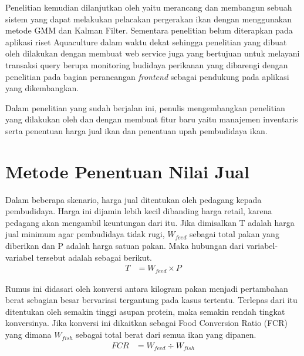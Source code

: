 Penelitian \citep{bagus2022} kemudian dilanjutkan oleh \citep{hafiz2021} yaitu merancang dan membangun sebuah sistem yang dapat melakukan pelacakan pergerakan ikan dengan menggunakan metode GMM dan Kalman Filter. Sementara penelitian \citep{fadhil2021} belum diterapkan pada aplikasi riset Aquaculture dalam waktu dekat sehingga penelitian yang dibuat oleh \citep{andri2022} dilakukan dengan membuat web service juga yang bertujuan untuk melayani transaksi query berupa monitoring budidaya perikanan yang dibarengi dengan penelitian \citep{gian2022} pada bagian perancangan \textit{frontend} sebagai pendukung pada aplikasi yang dikembangkan.

Dalam penelitian yang sudah berjalan ini, penulis mengembangkan penelitian yang dilakukan oleh \citep{andri2022} dan \citep{gian2022} dengan membuat fitur baru yaitu manajemen inventaris serta penentuan harga jual ikan dan penentuan upah pembudidaya ikan.

\section{Metode Penentuan Nilai Jual}

Dalam beberapa skenario, harga jual ditentukan oleh pedagang kepada pembudidaya. Harga ini dijamin lebih kecil dibanding harga retail, karena pedagang akan mengambil keuntungan dari itu. Jika dimisalkan T adalah harga jual minimum agar pembudidaya tidak rugi, $W_{feed}$ sebagai total pakan yang diberikan dan P adalah harga satuan pakan. Maka hubungan dari variabel-variabel tersebut adalah sebagai berikut.
\begin{equation}
    \begin{split}
		T
		&= W_{feed} \times P
    \end{split}
\end{equation}

Rumus ini didasari oleh konversi antara kilogram pakan menjadi pertambahan berat sebagian besar bervariasi tergantung pada kasus tertentu. Terlepas dari itu ditentukan oleh semakin tinggi asupan protein, maka semakin rendah tingkat konversinya. Jika konversi ini dikaitkan sebagai Food Conversion Ratio  (FCR) yang dimana $W_{fish}$ sebagai total berat dari semua ikan yang dipanen.
\begin{equation}
    \begin{split}
		FCR
		&= W_{feed } \div W_{fish}
    \end{split}
\end{equation}


